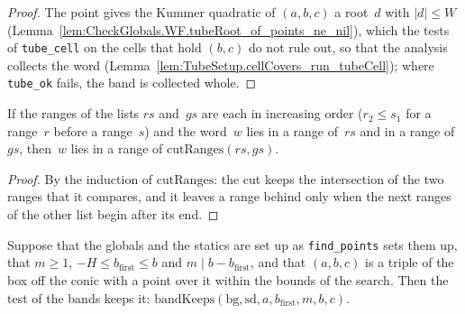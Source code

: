 \begin{proof}
  \leanok
  The point gives the Kummer quadratic of $(a, b, c)$ a root~$d$ with $|d| \le W$
  (Lemma~\ref{lem:CheckGlobals.WF.tubeRoot_of_points_ne_nil}), which the tests of
  \texttt{tube\_cell} on the cells that hold $(b, c)$ do not rule out, so that the analysis collects
  the word (Lemma~\ref{lem:TubeSetup.cellCovers_run_tubeCell}); where \texttt{tube\_ok} fails, the
  band is collected whole.
\end{proof}

\begin{lemma}\label{lem:exists_mem_cutRanges}
  \leanok
  If the ranges of the lists $\mathit{rs}$ and~$\mathit{gs}$ are each in increasing order ($r_2 \le
  s_1$ for a range~$r$ before a range~$s$) and the word~$w$ lies in a range of~$\mathit{rs}$ and in
  a range of~$\mathit{gs}$, then~$w$ lies in a range of $\mathrm{cutRanges}(\mathit{rs},
  \mathit{gs})$.
\end{lemma}

\begin{proof}
  \leanok
  By the induction of $\mathrm{cutRanges}$: the cut keeps the intersection of the two ranges that it
  compares, and it leaves a range behind only when the next ranges of the other list begin after
  its end.
\end{proof}

\begin{lemma}\label{lem:bandKeeps_of_points_ne_nil}
  \leanok
  Suppose that the globals and the statics are set up as \texttt{find\_points} sets them up, that
  $m \ge 1$, $-H \le b_{\mathrm{first}} \le b$ and $m \mid b - b_{\mathrm{first}}$, and that
  $(a, b, c)$ is a triple of the box off the conic with a point over it within the bounds of the
  search. Then the test of the bands keeps it:
  $\mathrm{bandKeeps}(\mathrm{bg}, \mathrm{sd}, a, b_{\mathrm{first}}, m, b, c)$.
\end{lemma}


